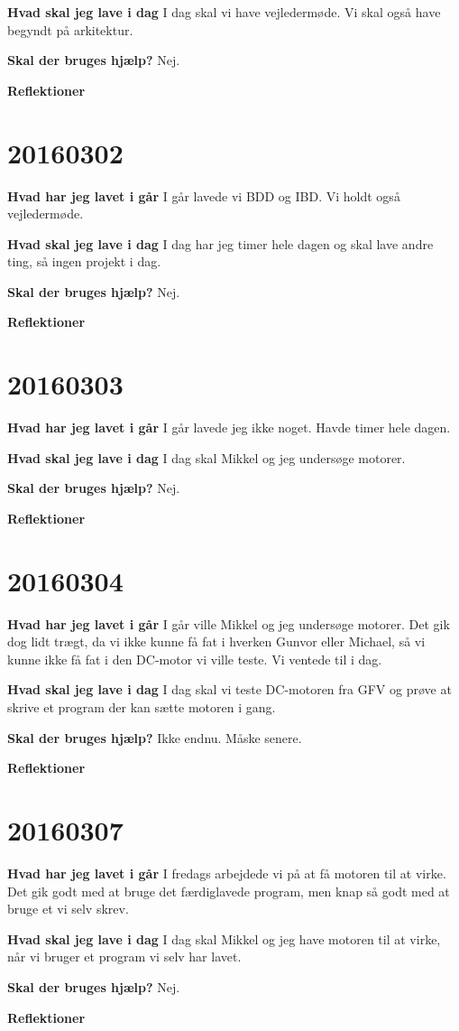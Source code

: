 \documentclass{article}
\begin{document}
	\textbf{Hvad skal jeg lave i dag}
	I dag skal vi have vejledermøde. Vi skal også have begyndt på arkitektur. 
	
	\textbf{Skal der bruges hjælp?}
	Nej. 
	
	\textbf{Reflektioner}

	\section{20160302}

	\textbf{Hvad har jeg lavet i går}
	I går lavede vi BDD og IBD. Vi holdt også vejledermøde. 
	
	\textbf{Hvad skal jeg lave i dag}
	I dag har jeg timer hele dagen og skal lave andre ting, så ingen projekt i dag. 
	
	\textbf{Skal der bruges hjælp?}
	Nej. 

	\textbf{Reflektioner}


	\section{20160303}
	
	\textbf{Hvad har jeg lavet i går}
	I går lavede jeg ikke noget. Havde timer hele dagen.  
	
	\textbf{Hvad skal jeg lave i dag}
	I dag skal Mikkel og jeg undersøge motorer.   
	
	\textbf{Skal der bruges hjælp?}
	Nej. 
	
	\textbf{Reflektioner}
	
	
	\section{20160304}
	
	\textbf{Hvad har jeg lavet i går}
	I går ville Mikkel og jeg undersøge motorer. Det gik dog lidt trægt, da vi ikke kunne få fat i hverken Gunvor eller Michael, så vi kunne ikke få fat i den DC-motor vi ville teste. Vi ventede til i dag. 
	
	\textbf{Hvad skal jeg lave i dag}
	I dag skal vi teste DC-motoren fra GFV og prøve at skrive et program der kan sætte motoren i gang. 
	
	\textbf{Skal der bruges hjælp?}
	Ikke endnu. Måske senere. 
	
	\textbf{Reflektioner}
	
	\section{20160307}
	
	\textbf{Hvad har jeg lavet i går}
	I fredags arbejdede vi på at få motoren til at virke. Det gik godt med at bruge det færdiglavede program, men knap så godt med at bruge et vi selv skrev. 
	
	\textbf{Hvad skal jeg lave i dag}
	I dag skal Mikkel og jeg have motoren til at virke, når vi bruger et program vi selv har lavet. 
	
	\textbf{Skal der bruges hjælp?}
	Nej. 
	
	\textbf{Reflektioner}
	
\end{document}
